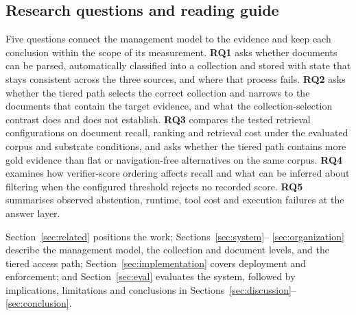 \subsection{Research questions and reading guide}
\label{sec:rq}

Five questions connect the management model to the evidence and keep each
conclusion within the scope of its measurement. \textbf{RQ1} asks whether
documents can be parsed, automatically classified into a collection and stored
with state that stays consistent across the three sources, and where that
process fails. \textbf{RQ2} asks whether the tiered path selects the correct
collection and narrows to the documents that contain the target evidence, and
what the collection-selection contrast does and does not establish.
\textbf{RQ3} compares the tested retrieval configurations on document recall,
ranking and retrieval cost under the evaluated corpus and substrate
conditions, and asks whether the tiered path contains more gold evidence than
flat or navigation-free alternatives on the same corpus. \textbf{RQ4} examines
how verifier-score ordering affects recall and what can be inferred about
filtering when the configured threshold rejects no recorded score.
\textbf{RQ5} summarises observed abstention, runtime, tool cost and execution
failures at the answer layer.

Section~\ref{sec:related} positions the work; Sections~\ref{sec:system}--
\ref{sec:organization} describe the management model, the collection and
document levels, and the tiered access path;
Section~\ref{sec:implementation} covers deployment and enforcement; and
Section~\ref{sec:eval} evaluates the system, followed by implications,
limitations and conclusions in
Sections~\ref{sec:discussion}--\ref{sec:conclusion}.
